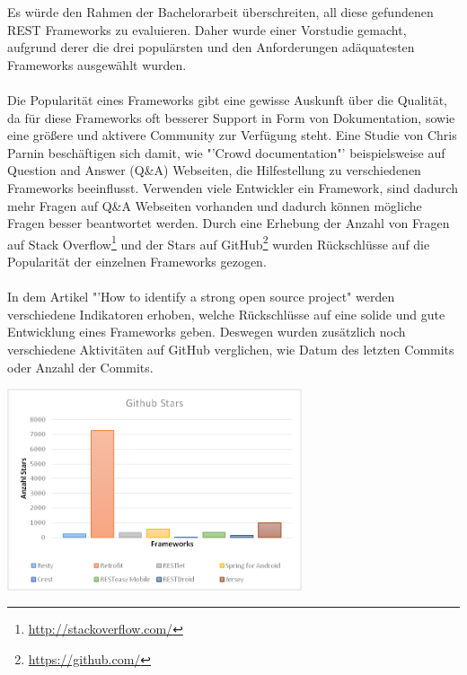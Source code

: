 Es würde den Rahmen der Bachelorarbeit überschreiten, all diese gefundenen REST Frameworks zu evaluieren. Daher wurde einer Vorstudie gemacht, aufgrund derer die drei populärsten und den Anforderungen adäquatesten Frameworks ausgewählt wurden.
\\\\
Die Popularität eines Frameworks gibt eine gewisse Auskunft über die Qualität, da für diese Frameworks oft besserer Support in Form von Dokumentation, sowie eine größere und aktivere Community zur Verfügung steht. Eine Studie von Chris Parnin\cite{parnin2012crowd} beschäftigen sich damit, wie "'Crowd documentation"' beispielsweise auf Question and Answer (Q\&A) Webseiten, die Hilfestellung zu verschiedenen Frameworks beeinflusst. Verwenden viele Entwickler ein Framework, sind dadurch mehr Fragen auf Q\&A Webseiten vorhanden und dadurch können mögliche Fragen besser beantwortet werden. Durch eine Erhebung der Anzahl von Fragen auf Stack Overflow\footnote{\href{http://stackoverflow.com/}{http://stackoverflow.com/}} und der Stars auf GitHub\footnote{\href{https://github.com/}{https://github.com/}} wurden Rückschlüsse auf die Popularität der einzelnen Frameworks gezogen.  
\\\\
In dem Artikel "'How to identify a strong open source project"\cite{balter:strongOS} werden verschiedene Indikatoren erhoben, welche Rückschlüsse auf eine solide und gute Entwicklung eines Frameworks geben. Deswegen wurden zusätzlich noch verschiedene Aktivitäten auf GitHub verglichen, wie Datum des letzten Commits oder Anzahl der Commits.

\begin{minipage}{\textwidth} 
	\centering	
	\includegraphics[width=0.65\textwidth]{figures/github_stars.png}
	\label{figure:githubStars}
	\vspace{2ex}
\end{minipage}

